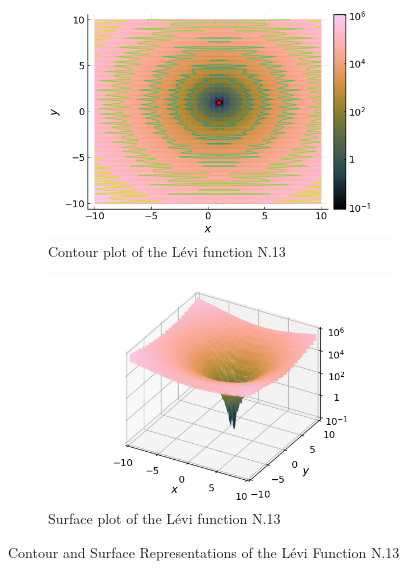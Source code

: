   \begin{figure}[ht!]
    \centering
    \begin{subfigure}[b]{0.45\textwidth}
      \centering
      \includegraphics[width=\textwidth]{img/test_functions/levi_contour.png}
      \caption{Contour plot of the Lévi function N.13}
      \label{fig:app:test:levi:contour}
    \end{subfigure}
    \hfill
    \begin{subfigure}[b]{0.45\textwidth}
      \centering
      \includegraphics[width=\textwidth]{img/test_functions/levi_surface.png}
      \caption{Surface plot of the Lévi function N.13}
      \label{fig:app:test:levi:surface}
    \end{subfigure}
    \caption{Contour and Surface Representations of the Lévi Function N.13}
    \label{fig:app:test:levi}
  \end{figure}
